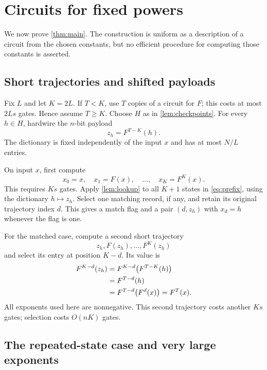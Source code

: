 \documentclass[11pt]{article}
\theoremstyle{definition}
\theoremstyle{remark}
\numberwithin{equation}{section}
\begin{document}
\section{Circuits for fixed powers}\label{sec:fixed}

We now prove \cref{thm:main}.  The construction is uniform as a description
of a circuit from the chosen constants, but no efficient procedure for
computing those constants is asserted.

\subsection{Short trajectories and shifted payloads}

Fix $L$ and let $K=2L$.  If $T<K$, use $T$ copies of a circuit for $F$;
this costs at most $2Ls$ gates.  Hence assume $T\geq K$.
Choose $H$ as in \cref{lem:checkpoints}.  For every $h\in H$, hardwire the
$n$-bit payload
\begin{equation}\label{eq:payload}
  z_h=F^{T-K}(h).
\end{equation}
The dictionary is fixed independently of the input $x$ and has at most
$N/L$ entries.

On input $x$, first compute
\begin{equation}\label{eq:prefix}
  x_0=x,\quad x_1=F(x),\quad\ldots,\quad x_K=F^K(x).
\end{equation}
This requires $Ks$ gates.  Apply \cref{lem:lookup} to all $K+1$ states in
\cref{eq:prefix}, using the dictionary $h\mapsto z_h$.  Select one
matching record, if any, and retain its original trajectory index $d$.
This gives a match flag and a pair $(d,z_h)$ with $x_d=h$ whenever the
flag is one.

For the matched case, compute a second short trajectory
\[
  z_h,F(z_h),\ldots,F^K(z_h)
\]
and select its entry at position $K-d$.  Its value is
\begin{align}
  F^{K-d}(z_h)
    &=F^{K-d}\bigl(F^{T-K}(h)\bigr)\notag\\
    &=F^{T-d}(h)\notag\\
    &=F^{T-d}\bigl(F^d(x)\bigr)
     =F^T(x).\label{eq:identity}
\end{align}
All exponents used here are nonnegative.  This second trajectory costs
another $Ks$ gates; selection costs $O(nK)$ gates.

\subsection{The repeated-state case and very large exponents}
\end{document}
